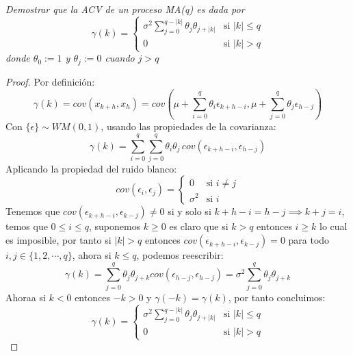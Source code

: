 \documentclass[11pt,letterpaper]{article}
\begin{document}
\begin{tcolorbox}[
	title = \textcolor{black}{\textcolor{white}{Problema 13}},]
\textit{Demostrar que la ACV de un proceso MA(q) es dada por
\[
\gamma(k) = 
\begin{cases} 
\sigma^2\sum_{j=0}^{q-|k|}\theta_j\theta_{j+|k|}& \text{si } |k|\leq q \\
0 & \text{si } |k|>q 
\end{cases}
\]
donde $\theta_0:=1$ y $\theta_j:=0$ cuando $j>q$}
\end{tcolorbox}
\begin{proof}
    Por definici\'on:\,\\
    \begin{equation*}
        \gamma(k)=cov(x_{k+h},x_h)=cov\left(\mu+\sum_{i=0}^q\theta_i\epsilon_{k+h-i},\mu+\sum_{j=0}^q\theta_j\epsilon_{h-j}\right)
    \end{equation*}
    Con $\{\epsilon\}\sim WM(0,1)$, usando las propiedades de la covarianza:\,\\
    \begin{equation*}
        \gamma(k)=\sum_{i=0}^q\sum_{j=0}^q\theta_i\theta_j\,cov(\epsilon_{k+h-i},\epsilon_{h-j})
    \end{equation*}
    Aplicando la propiedad del ruido blanco:\,\\
    \begin{equation*}
        cov(\epsilon_i,\epsilon_j)= 
    \begin{cases} 
        0& \text{si } i\neq j\\
        \sigma^2 & \text{si } i 
    \end{cases}
    \end{equation*}
    Tenemos que $cov(\epsilon_{k+h-i},\epsilon_{k-j})\neq 0$ si y solo si $k+h-i=h-j\implies k+j=i$, temos que $0\leq i\leq q$, suponemos $k\geq 0$ es claro que si $k>q$ entonces $i\geq k$ lo cual es imposible, por tanto si $|k|>q$ entonces
    $cov(\epsilon_{k+h-i},\epsilon_{k-j})=0$ para todo $i,j\in \{1,2,\cdots,q\}$, ahora si $k\leq q$, podemos reescribir:\,\\
    \begin{equation*}
        \gamma(k)=\sum_{j=0}^q\theta_{j}\theta_{j+k}cov(\epsilon_{h-j},\epsilon_{h-j})=\sigma^2\sum_{j=0}^q \theta_{j}\theta_{j+k}
    \end{equation*}
    Ahoraa si $k<0$ entonces $-k>0$ y $\gamma(-k)=\gamma(k)$, por tanto concluimos:\,\\
    \begin{equation*}
        \gamma(k) = 
\begin{cases} 
\sigma^2\sum_{j=0}^{q-|k|}\theta_j\theta_{j+|k|}& \text{si } |k|\leq q \\
0 & \text{si } |k|>q 
\end{cases}
    \end{equation*}
\end{proof}
\end{document}
